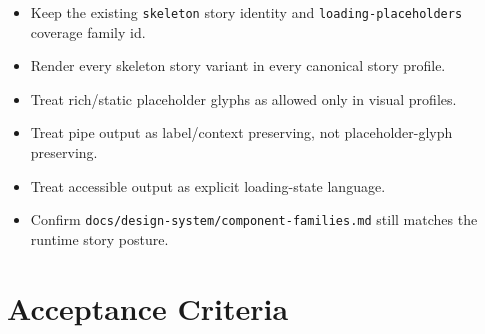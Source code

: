 \begin{itemize}
\tightlist
\item
  Keep the existing \texttt{s\allowbreak{}k\allowbreak{}e\allowbreak{}l\allowbreak{}e\allowbreak{}t\allowbreak{}o\allowbreak{}n} story identity and \texttt{l\allowbreak{}o\allowbreak{}a\allowbreak{}d\allowbreak{}i\allowbreak{}n\allowbreak{}g\allowbreak{}-\allowbreak{}p\allowbreak{}l\allowbreak{}a\allowbreak{}c\allowbreak{}e\allowbreak{}h\allowbreak{}o\allowbreak{}l\allowbreak{}d\allowbreak{}e\allowbreak{}r\allowbreak{}s} coverage family id.
\item
  Render every skeleton story variant in every canonical story profile.
\item
  Treat rich/static placeholder glyphs as allowed only in visual profiles.
\item
  Treat pipe output as label/context preserving, not placeholder-glyph preserving.
\item
  Treat accessible output as explicit loading-state language.
\item
  Confirm \texttt{d\allowbreak{}o\allowbreak{}c\allowbreak{}s\allowbreak{}/\allowbreak{}d\allowbreak{}e\allowbreak{}s\allowbreak{}i\allowbreak{}g\allowbreak{}n\allowbreak{}-\allowbreak{}s\allowbreak{}y\allowbreak{}s\allowbreak{}t\allowbreak{}e\allowbreak{}m\allowbreak{}/\allowbreak{}c\allowbreak{}o\allowbreak{}m\allowbreak{}p\allowbreak{}o\allowbreak{}n\allowbreak{}e\allowbreak{}n\allowbreak{}t\allowbreak{}-\allowbreak{}f\allowbreak{}a\allowbreak{}m\allowbreak{}i\allowbreak{}l\allowbreak{}i\allowbreak{}e\allowbreak{}s\allowbreak{}.\allowbreak{}m\allowbreak{}d} still matches the runtime story posture.
\end{itemize}

\section{Acceptance Criteria}\label{record-093-acceptance-criteria}


